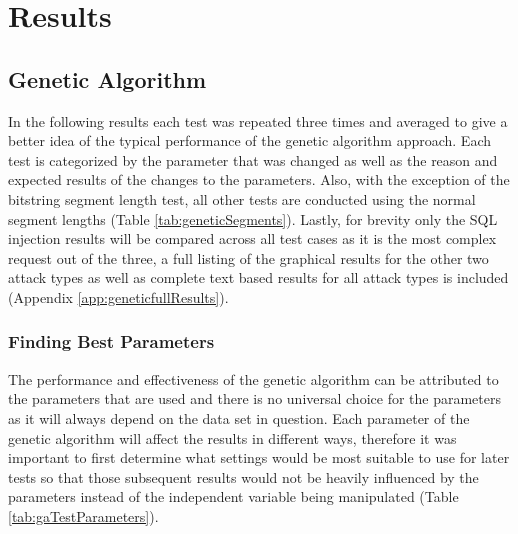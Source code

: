 \chapter{Results} 

\section{Genetic Algorithm}

In the following results each test was repeated three times and averaged to give a better idea of the typical performance of the genetic algorithm approach.  Each test is categorized by the parameter that was changed as well as the reason and expected results of the changes to the parameters.  Also, with the exception of the bitstring segment length test, all other tests are conducted using the normal segment lengths (Table \ref{tab:geneticSegments}).  Lastly, for brevity only the SQL injection results will be compared across all test cases as it is the most complex request out of the three, a full listing of the graphical results for the other two attack types as well as complete text based results for all attack types is included (Appendix \ref{app:geneticfullResults}).

\subsection{Finding Best Parameters}

The performance and effectiveness of the genetic algorithm can be attributed to the parameters that are used and there is no universal choice for the parameters as it will always depend on the data set in question.\cite{optimalPopulationGenetic}  Each parameter of the genetic algorithm will affect the results in different ways, therefore it was important to first determine what settings would be most suitable to use for later tests so that those subsequent results would not be heavily influenced by the parameters instead of the independent variable being manipulated (Table \ref{tab:gaTestParameters}).  

